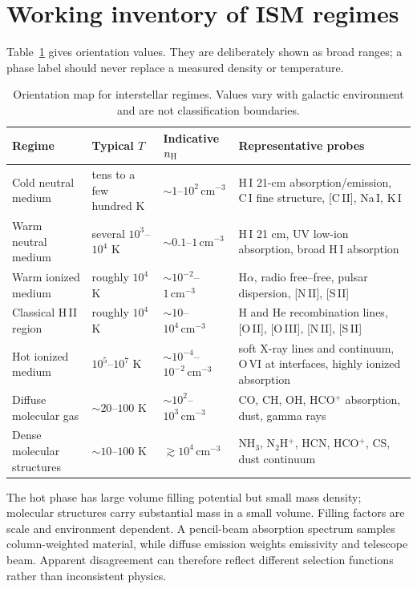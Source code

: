 \section{Working inventory of ISM regimes}

Table~\ref{tab:ism-regime-inventory} gives orientation values.  They are deliberately
shown as broad ranges; a phase label should never replace a measured density or
temperature.

\begin{table}[tbp]
\centering
\caption{Orientation map for interstellar regimes.  Values vary with galactic
environment and are not classification boundaries.}
\label{tab:ism-regime-inventory}
\begin{tabularx}{\textwidth}{@{}
 >{\raggedright\arraybackslash}p{}
 >{\raggedright\arraybackslash}p{}
 >{\raggedright\arraybackslash}p{}
 >{\raggedright\arraybackslash}X@{}}
\toprule
Regime & Typical $T$ & Indicative $n_{\rm H}$ & Representative probes \\
\midrule
Cold neutral medium & tens to a few hundred K &
$\sim1$--$10^2\,\mathrm{cm^{-3}}$ & H\,I 21-cm absorption/emission,
C\,I fine structure, [C\,II], Na\,I, K\,I \\
Warm neutral medium & several $10^3$--$10^4$ K &
$\sim0.1$--$1\,\mathrm{cm^{-3}}$ & H\,I 21 cm, UV low-ion absorption,
broad H\,I absorption \\
Warm ionized medium & roughly $10^4$ K &
$\sim10^{-2}$--$1\,\mathrm{cm^{-3}}$ & H$\alpha$, radio free--free,
pulsar dispersion, [N\,II], [S\,II] \\
Classical H\,II region & roughly $10^4$ K &
$\sim10$--$10^4\,\mathrm{cm^{-3}}$ & H and He recombination lines,
[O\,II], [O\,III], [N\,II], [S\,II] \\
Hot ionized medium & $10^5$--$10^7$ K &
$\sim10^{-4}$--$10^{-2}\,\mathrm{cm^{-3}}$ & soft X-ray lines and
continuum, O\,VI at interfaces, highly ionized absorption \\
Diffuse molecular gas & $\sim20$--$100$ K &
$\sim10^2$--$10^3\,\mathrm{cm^{-3}}$ & CO, CH, OH, HCO$^+$ absorption,
dust, gamma rays \\
Dense molecular structures & $\sim10$--$100$ K &
$\gtrsim10^4\,\mathrm{cm^{-3}}$ & NH$_3$, N$_2$H$^+$, HCN, HCO$^+$,
CS, dust continuum \\
\bottomrule
\end{tabularx}
\end{table}

The hot phase has large volume filling potential but small mass density; molecular
structures carry substantial mass in a small volume.  Filling factors are scale and
environment dependent.  A pencil-beam absorption spectrum samples column-weighted
material, while diffuse emission weights emissivity and telescope beam.  Apparent
disagreement can therefore reflect different selection functions rather than
inconsistent physics.

